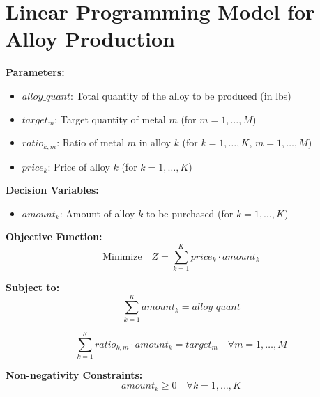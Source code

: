\documentclass{article}
\begin{document}
\section*{Linear Programming Model for Alloy Production}

\textbf{Parameters:}
\begin{itemize}
    \item \( alloy\_quant \): Total quantity of the alloy to be produced (in lbs)
    \item \( target_{m} \): Target quantity of metal \( m \) (for \( m = 1, \ldots, M \))
    \item \( ratio_{k, m} \): Ratio of metal \( m \) in alloy \( k \) (for \( k = 1, \ldots, K \), \( m = 1, \ldots, M \))
    \item \( price_{k} \): Price of alloy \( k \) (for \( k = 1, \ldots, K \))
\end{itemize}

\textbf{Decision Variables:}
\begin{itemize}
    \item \( amount_{k} \): Amount of alloy \( k \) to be purchased (for \( k = 1, \ldots, K \))
\end{itemize}

\textbf{Objective Function:}
\[
\text{Minimize} \quad Z = \sum_{k=1}^{K} price_{k} \cdot amount_{k}
\]

\textbf{Subject to:}
\[
\sum_{k=1}^{K} amount_{k} = alloy\_quant
\]

\[
\sum_{k=1}^{K} ratio_{k, m} \cdot amount_{k} = target_{m} \quad \forall m = 1, \ldots, M
\]

\textbf{Non-negativity Constraints:}
\[
amount_{k} \geq 0 \quad \forall k = 1, \ldots, K
\]
\end{document}
